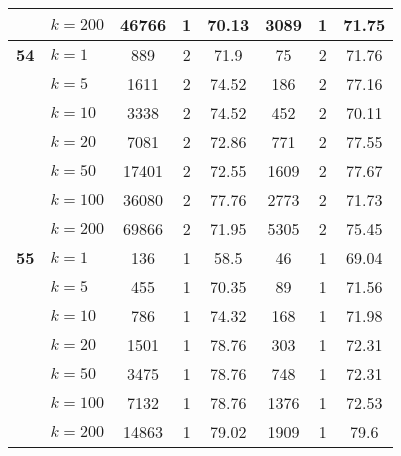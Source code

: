 \begin{table}[htbp]
\begin{tabular}{|l|l|c|c|c|c|c|c|}
     & $k=200$ & 46766 & 1 & 70.13 & 3089 & 1 & 71.75 \\ \hline
    \multicolumn{1}{|r|}{\textbf{54}} & $k=1$ & 889 & 2 & 71.9 & 75 & 2 & 71.76 \\ 
     & $k=5$ & 1611 & 2 & 74.52 & 186 & 2 & 77.16 \\ 
     & $k=10$ & 3338 & 2 & 74.52 & 452 & 2 & 70.11 \\ 
     & $k=20$ & 7081 & 2 & 72.86 & 771 & 2 & 77.55 \\ 
     & $k=50$ & 17401 & 2 & 72.55 & 1609 & 2 & 77.67 \\ 
     & $k=100$ & 36080 & 2 & 77.76 & 2773 & 2 & 71.73 \\ 
     & $k=200$ & 69866 & 2 & 71.95 & 5305 & 2 & 75.45 \\ \hline
    \multicolumn{1}{|r|}{\textbf{55}} & $k=1$ & 136 & 1 & 58.5 & 46 & 1 & 69.04 \\ 
     & $k=5$ & 455 & 1 & 70.35 & 89 & 1 & 71.56 \\ 
     & $k=10$ & 786 & 1 & 74.32 & 168 & 1 & 71.98 \\ 
     & $k=20$ & 1501 & 1 & 78.76 & 303 & 1 & 72.31 \\ 
     & $k=50$ & 3475 & 1 & 78.76 & 748 & 1 & 72.31 \\ 
     & $k=100$ & 7132 & 1 & 78.76 & 1376 & 1 & 72.53 \\ 
     & $k=200$ & 14863 & 1 & 79.02 & 1909 & 1 & 79.6 \\ \hline
    \end{tabular}
\end{table}
